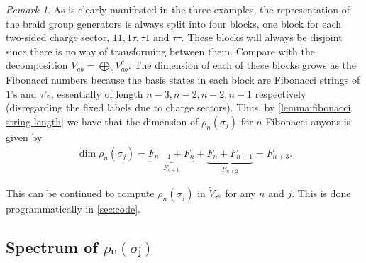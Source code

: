 \documentclass[a4paper,10pt,oneside]{book}
\theoremstyle{plain}
\theoremstyle{definition}
\theoremstyle{remark}
\newtheorem{remark}{Remark}[section]
\begin{document}
\begin{remark}\label{remark:fibonacci sigma dimension}
  As is clearly manifested in the three examples, the representation of the braid group generators is always split into four blocks, one block for each two-sided charge sector, $11, 1τ, τ1$ and $ττ$. These blocks will always be disjoint since there is no way of transforming between them. Compare with the decomposition $V_{ab} = \bigoplus_c V_{ab}^c$. The dimension of each of these blocks grows as the Fibonacci numbers because the basis states in each block are Fibonacci strings of $1$'s and $τ$'s, essentially of length $n-3, n-2, n-2, n-1$ respectively (disregarding the fixed labels due to charge sectors). Thus, by \cref{lemma:fibonacci string length} we have that the dimension of $ρ_n(σ_j)$ for $n$ Fibonacci anyons is given by
  \begin{align*}
    \operatorname{dim} ρ_n (σ_j) = \underbrace{F_{n-1} + F_{n}}_{F_{n+1}} + \underbrace{F_{n} + F_{n+1}}_{F_{n+2}} = F_{n+3}.
  \end{align*}
\end{remark}

This can be continued to compute $ρ_n(σ_j)$ in $\widetilde{V}_{τ^n}$ for any $n$ and $j$. This is done programmatically in \cref{sec:code}.










\subsection{Spectrum of $ρₙ(σⱼ)$}
\end{document}
